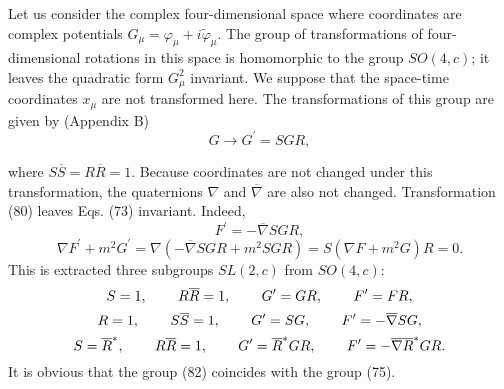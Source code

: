 \documentclass[a4paper,12pt]{article}
\begin{document}
Let us consider the complex four-dimensional space where
coordinates are complex potentials $G_\mu =\varphi_\mu
+i\widetilde{\varphi}_\mu $. The group of transformations of
four-dimensional rotations in this space is homomorphic to the
group $ SO(4,c) $; it leaves the quadratic form $G_\mu ^2$
invariant. We suppose that the space-time coordinates $x_\mu $ are
not transformed here. The transformations of this group are given
by (Appendix B)
\begin{equation}
G\rightarrow G^{\prime }=SGR,  \label{80}
\end{equation}

where $S\overline{S}=R\overline{R}=1$. Because coordinates are not changed
under this transformation, the quaternions $\nabla $ and $\overline{\nabla }$
are also not changed. Transformation (80) leaves Eqs. (73) invariant.
Indeed,
\[
F^{\prime }=-\overline{\nabla }SGR,
\]
\vspace{-8mm}
\begin{equation}
\label{81}
\end{equation}
\vspace{-8mm}
\[
\nabla F^{\prime }+m^2G^{\prime }=\nabla \left( -\overline{\nabla
} SGR+m^2SGR\right) =S\left( \nabla F+m^2G\right) R=0 .
\]
This is extracted three subgroups $SL(2,c)$ from $SO(4,c)$:
\begin{equation}
S=1,\hspace{0.3in}R\overline{R}=1,\hspace{0.3in}G^{\prime
}=GR,\hspace{0.3in}F^{\prime }=FR,  \label{82}
\end{equation}
\begin{equation}
R=1,\hspace{0.3in}S\overline{S}=1,\hspace{0.3in}G^{\prime
}=SG,\hspace{0.3in}F^{\prime }=- \overline{\nabla }SG,  \label{83}
\end{equation}
\begin{equation}
S=\overline{R}^{*},\hspace{0.3in}R\overline{R}=1,\hspace{0.3in}G^{\prime
}=\overline{R} ^{*}GR,\hspace{0.3in}F^{\prime }=-\overline{\nabla
}\overline{R}^{*}GR. \label{84}
\end{equation}
It is obvious that the group (82) coincides with the group (75).
\end{document}
